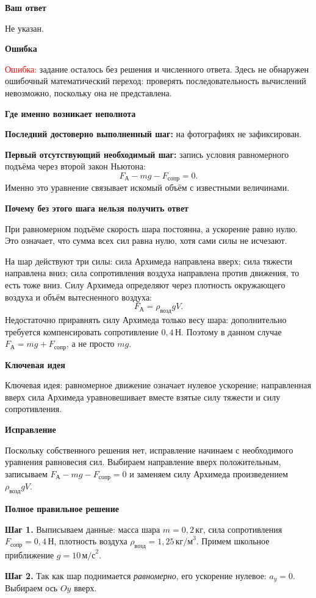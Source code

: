 \documentclass[12pt,a4paper]{article}
\newcommand{\reviewfield}[1]{\par\smallskip\noindent\textbf{#1}\par}
\newcommand{\mathunit}[1]{\,\text{#1}}
\begin{document}
\reviewfield{Ваш ответ}
Не указан.

\reviewfield{Ошибка}
\textcolor{red}{Ошибка:} задание осталось без решения и численного ответа. Здесь не обнаружен ошибочный математический переход: проверять последовательность вычислений невозможно, поскольку она не представлена.

\reviewfield{Где именно возникает неполнота}
\textbf{Последний достоверно выполненный шаг:} на фотографиях не зафиксирован.

\textbf{Первый отсутствующий необходимый шаг:} запись условия равномерного подъёма через второй закон Ньютона:
\[
F_{\text{А}}-mg-F_{\text{сопр}}=0.
\]
Именно это уравнение связывает искомый объём с известными величинами.

\reviewfield{Почему без этого шага нельзя получить ответ}
При равномерном подъёме скорость шара постоянна, а ускорение равно нулю. Это означает, что сумма всех сил равна нулю, хотя сами силы не исчезают.

На шар действуют три силы: сила Архимеда направлена вверх; сила тяжести направлена вниз; сила сопротивления воздуха направлена против движения, то есть тоже вниз. Силу Архимеда определяют через плотность окружающего воздуха и объём вытесненного воздуха:
\[
F_{\text{А}}=\rho_{\text{возд}}gV.
\]
Недостаточно приравнять силу Архимеда только весу шара: дополнительно требуется компенсировать сопротивление $0{,}4\mathunit{Н}$. Поэтому в данном случае $F_{\text{А}}=mg+F_{\text{сопр}}$, а не просто $mg$.

\reviewfield{Ключевая идея}
\textcolor{blue!60!black}{Ключевая идея:} равномерное движение означает нулевое ускорение; направленная вверх сила Архимеда уравновешивает вместе взятые силу тяжести и силу сопротивления.

\reviewfield{Исправление}
Поскольку собственного решения нет, исправление начинаем с необходимого уравнения равновесия сил. Выбираем направление вверх положительным, записываем $F_{\text{А}}-mg-F_{\text{сопр}}=0$ и заменяем силу Архимеда произведением $\rho_{\text{возд}}gV$.

\reviewfield{Полное правильное решение}
\textbf{Шаг 1.} Выписываем данные: масса шара $m=0{,}2\mathunit{кг}$, сила сопротивления $F_{\text{сопр}}=0{,}4\mathunit{Н}$, плотность воздуха $\rho_{\text{возд}}=1{,}25\,\text{кг/м}^{3}$. Примем школьное приближение $g=10\,\text{м/с}^{2}$.

\textbf{Шаг 2.} Так как шар поднимается \emph{равномерно}, его ускорение нулевое: $a_y=0$. Выбираем ось $Oy$ вверх.
\end{document}
